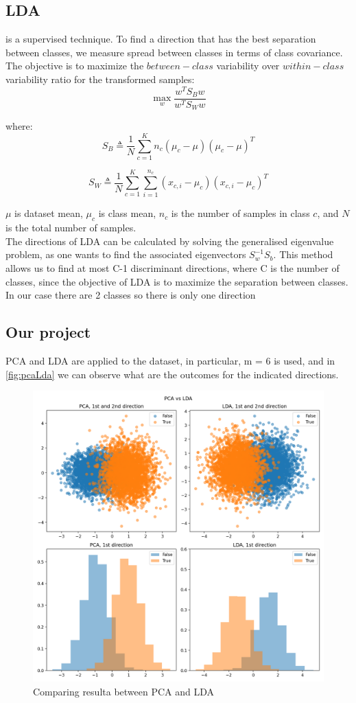 
\subsection{LDA}
\label{subsec:LDA} is a supervised technique.
To find a direction that has the best separation between classes, we measure spread between classes in terms of class covariance.
The objective is to maximize the \(between-class\) variability over \(within-class\) variability ratio for the transformed samples:
\begin{equation}
    \underset{w}{\max} \frac{w^T S_B w}{w^T S_W w}
    \label{eq:ldaFunct}
\end{equation}

where:
\begin{equation}
    S_B  \triangleq \frac{1}{N}\sum_{c=1}^{K} n_c (\mu_c - \mu)(\mu_c - \mu)^T
    \label{eq:betweenClass}
\end{equation}

\begin{equation}
    S_W \triangleq \frac{1}{N}\sum_{c=1}^{K} \sum_{i=1}^{n_c} (x_{c,i} - \mu_c)(x_{c,i} - \mu_c)^T
    \label{eq:withinClass}
\end{equation}

\(\mu\) is dataset mean, \(\mu_{c}\) is class mean, \(n_c\) is the number of samples in class \(c\), and \(N\) is the total number of samples.\\
The directions of LDA can be calculated by solving the generalised eigenvalue problem, as one wants to find the associated eigenvectors \(S_w^{-1}S_b\).
This method allows us to find at most C-1 discriminant directions, where C is the number of classes, since the objective of
LDA is to maximize the separation between classes.
In our case there are 2 classes so there is only one direction


\subsection{Our project}
\label{subsec:ourProject}
PCA and LDA are applied to the dataset, in particular, m = 6 is used, and in \autoref{fig:pcaLda} we can observe
what are the outcomes for the indicated directions.

\begin{figure}[h]
    \centering
    \includegraphics[width=0.5\linewidth]{Lab/03. Lab 03/Images/02. PVA_LDA}
    \caption{Comparing resulta between PCA and LDA}
    \label{fig:pcaLda}
\end{figure}

